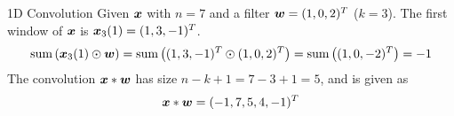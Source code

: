 \begin{frame}{1D Convolution}
Given ${\boldsymbol x}$ with $n=7$ and a
	filter ${\boldsymbol w} = (1,0,2)^T$ ($k=3$). The first window of
    ${\boldsymbol x}$ is ${\boldsymbol x}_3(1) = (1, 3, -1)^T$.%
    \begin{align*}
        \operatorname*{sum}\left({\boldsymbol x}_3(1) \odot {\boldsymbol w}\right) = \operatorname*{sum}\left(
        (1,3,-1)^T \odot (1,0,2)^T \right) = 
        \operatorname*{sum}\left( (1,0,-2)^T\right)  = -1
    \end{align*}
    The convolution ${\boldsymbol x} \ast {\boldsymbol w}$ has size $n-k+1 = 7-3+1 = 5$, and is
    given as 
    \[    {\boldsymbol x} \ast {\boldsymbol w} = (-1, 7, 5, 4 ,-1)^T \]

	\medskip


\end{frame}
